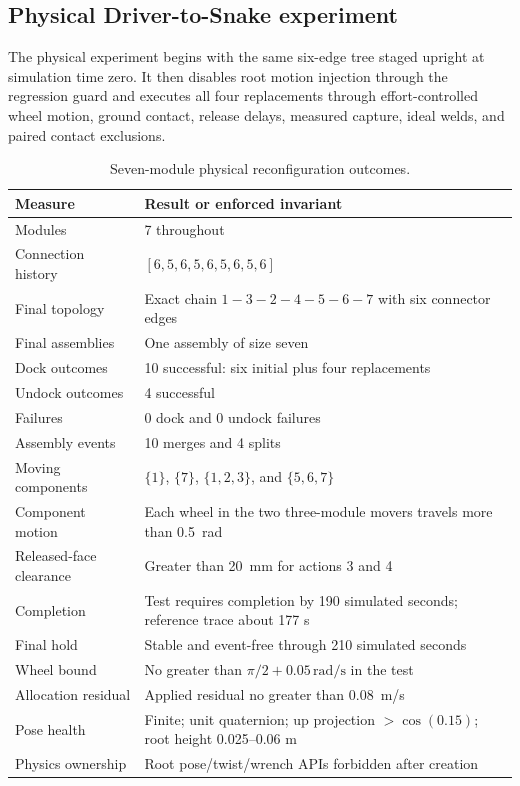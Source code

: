 \subsection{Physical Driver-to-Snake experiment}

The physical experiment begins with the same six-edge tree staged upright at simulation
time zero. It then disables root motion injection through the regression guard and
executes all four replacements through effort-controlled wheel motion, ground contact,
release delays, measured capture, ideal welds, and paired contact exclusions.

\begin{table}[htbp]
\centering
\caption{Seven-module physical reconfiguration outcomes.}
\label{tab:snake-results}
\begin{tabularx}{\textwidth}{L{0.38\textwidth}Y}
\toprule
Measure & Result or enforced invariant \\
\midrule
Modules & 7 throughout \\
Connection history & $[6,5,6,5,6,5,6,5,6]$ \\
Final topology & Exact chain $1-3-2-4-5-6-7$ with six connector edges \\
Final assemblies & One assembly of size seven \\
Dock outcomes & 10 successful: six initial plus four replacements \\
Undock outcomes & 4 successful \\
Failures & 0 dock and 0 undock failures \\
Assembly events & 10 merges and 4 splits \\
Moving components & $\{1\}$, $\{7\}$, $\{1,2,3\}$, and $\{5,6,7\}$ \\
Component motion & Each wheel in the two three-module movers travels more than \SI{0.5}{rad} \\
Released-face clearance & Greater than \SI{20}{mm} for actions 3 and 4 \\
Completion & Test requires completion by 190 simulated seconds; reference trace about 177 s \\
Final hold & Stable and event-free through 210 simulated seconds \\
Wheel bound & No greater than $\pi/2+0.05\,\mathrm{rad/s}$ in the test \\
Allocation residual & Applied residual no greater than \SI{0.08}{m/s} \\
Pose health & Finite; unit quaternion; up projection $>\cos(0.15)$; root height 0.025--0.06 m \\
Physics ownership & Root pose/twist/wrench APIs forbidden after creation \\
\bottomrule
\end{tabularx}
\end{table}

